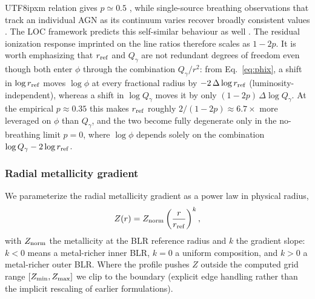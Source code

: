 \documentclass[linenumbers,trackchanges]{aastex701}
\begin{document}
\begin{CJK*}{UTF8}{ipxm}
relation gives $p\simeq0.5$ \citep{bentz2013}, while single-source breathing observations
that track an individual AGN as its continuum varies recover broadly consistent values
\citep{CackettHorne2006, Park2012, Lu2016, Wang2020breathing}.  The LOC framework predicts
this self-similar behaviour as well \citep{Korista2004}.  The residual ionization response
imprinted on the line ratios therefore scales as $1-2p$.  It is worth emphasizing that
$r_{\rm ref}$ and $Q_\gamma$ are not redundant degrees of freedom even though both enter
$\phi$ through the combination $Q_\gamma/r^2$: from Eq.~\ref{eq:phix}, a shift in
$\log r_{\rm ref}$ moves $\log\phi$ at every fractional radius by $-2\,\Delta\log r_{\rm ref}$
(luminosity-independent), whereas a shift in $\log Q_\gamma$ moves it by only
$(1-2p)\,\Delta\log Q_\gamma$.  At the empirical $p\approx0.35$ this makes $r_{\rm ref}$
roughly $2/(1-2p)\approx 6.7\times$ more leveraged on $\phi$ than $Q_\gamma$, and the two
become fully degenerate only in the no-breathing limit $p=0$, where $\log\phi$ depends solely
on the combination $\log Q_\gamma-2\log r_{\rm ref}$.

\subsubsection{Radial metallicity gradient}

We parameterize the radial metallicity gradient as a power law in physical radius,
\begin{equation}
    Z(r) = Z_{\rm norm}\left(\frac{r}{r_{\rm ref}}\right)^{k},
    \label{eq:Zprofile}
\end{equation}
with $Z_{\rm norm}$ the metallicity at the BLR reference radius and $k$ the gradient slope:
$k<0$ means a metal-richer inner BLR, $k=0$ a uniform composition, and $k>0$ a metal-richer
outer BLR.  Where the profile pushes $Z$ outside the computed grid range
$[Z_{\rm min},Z_{\rm max}]$ we clip to the boundary (explicit edge handling rather than the
implicit rescaling of earlier formulations).


\end{CJK*}
\end{document}
